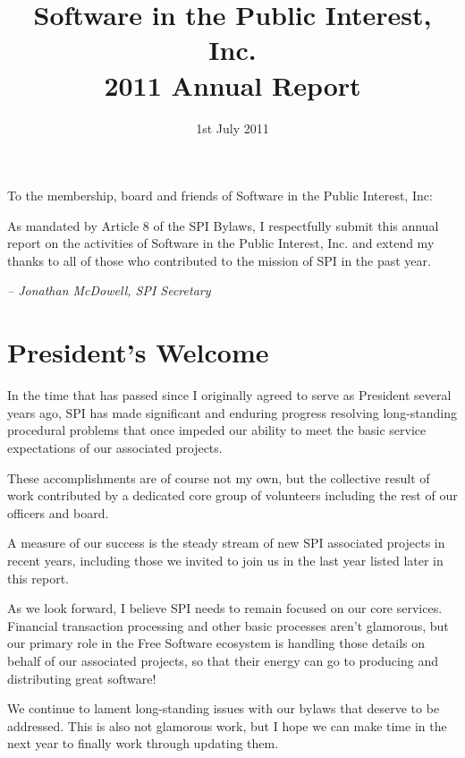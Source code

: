 \documentclass[letterpaper]{report}
\begin{document}
\title{Software in the Public Interest, Inc.\\
2011 Annual Report}
\date{1st July 2011}

\maketitle

To the membership, board and friends of Software in the Public Interest, Inc:

As mandated by Article 8 of the SPI Bylaws, I respectfully submit this annual
report on the activities of Software in the Public Interest, Inc. and extend my
thanks to all of those who contributed to the mission of SPI in the past year.

  \emph{-- Jonathan McDowell, SPI Secretary}

\newpage

\tableofcontents

\newpage

\chapter{President's Welcome}
\label{sec:president}

In the time that has passed since I originally agreed to serve as President
several years ago, SPI has made significant and enduring progress resolving
long-standing procedural problems that once impeded our ability to meet the
basic service expectations of our associated projects.

These accomplishments are of course not my own, but the collective result of
work contributed by a dedicated core group of volunteers including the rest of
our officers and board.

A measure of our success is the steady stream of new SPI associated projects in
recent years, including those we invited to join us in the last year listed
later in this report.

As we look forward, I believe SPI needs to remain focused on our core services.
Financial transaction processing and other basic processes aren't glamorous,
but our primary role in the Free Software ecosystem is handling those details
on behalf of our associated projects, so that their energy can go to producing
and distributing great software!

We continue to lament long-standing issues with our bylaws that deserve to be
addressed.  This is also not glamorous work, but I hope we can make time in the
next year to finally work through updating them.
\end{document}
